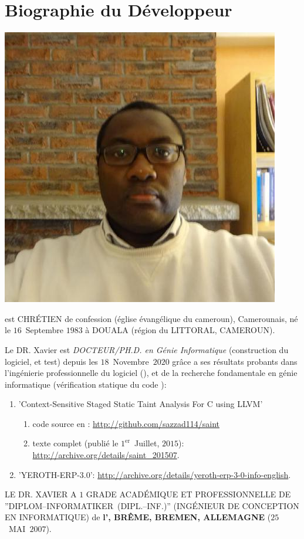 \section{Biographie du D\'eveloppeur}\label{chap:biographie}
\vspace{-0.9em}

\begin{center}
\includegraphics[scale=0.32]{../../francais/images/XavierNOUNDOU-2}
\end{center}

\textbf{\myfullacademicname} est CHR\'ETIEN de confession
(\'eglise \'evang\'elique du cameroun),
Camerounais, n\'e le $16$~Septembre $1983$ \`a
DOUALA (r\'egion du LITTORAL, CAMEROUN).

Le DR. Xavier est \textit{DOCTEUR/PH.D. en G\'enie Informatique}
(construction du logiciel, et test) depuis les $18$~Novembre~$2020$
gr\^ace a ses r\'esultats probants dans l'ing\'enierie
professionnelle du logiciel (\yerotherpblack), et de la recherche
fondamentale en g\'enie informatique (v\'erification statique
du code \cplusplus):

\begin{enumerate}
	\item 'Context-Sensitive Staged Static Taint Analysis
			For C using LLVM'
		\begin{enumerate}[1.]
			\itemsep -0.7em
			\item code source en \cplusplus: \url{http://github.com/sazzad114/saint}
			\item texte complet (publi\'e le $1^\text{er}$~Juillet, $2015$): \url{http://archive.org/details/saint_201507}.
		\end{enumerate}		 

	\item 'YEROTH-ERP-3.0': \url{http://archive.org/details/yeroth-erp-3-0-info-english}.\\
\end{enumerate}


LE DR. XAVIER A $1$ GRADE ACAD\'EMIQUE ET PROFESSIONNELLE
DE ''DIPLOM--INFORMATIKER~(DIPL.--INF.)''
(ING\'ENIEUR DE CONCEPTION EN INFORMATIQUE) de
\textbf{l'\bremenu, BR\^EME, BREMEN, ALLEMAGNE}
($25$~MAI~$2007$).

